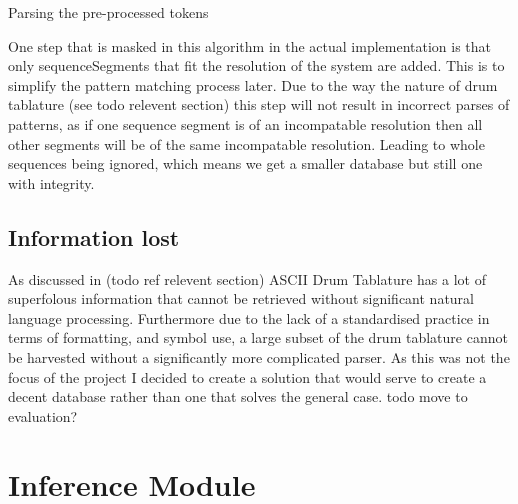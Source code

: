 \documentclass[12pt,twoside,notitlepage]{report}
\begin{document}
				\begin{algorithm}
				\caption{Parsing the pre-processed tokens}
				\label{algo:Parse}
				\begin{algorithmic}[1]
								\EndFor
							\EndFor
						\EndFor
						
					

					\EndProcedure
				\end{algorithmic}
				\end{algorithm}
				
				One step that is masked in this algorithm in the actual implementation is that only sequenceSegments that fit the resolution of the system are added. This is to simplify the pattern matching process later. Due to the way the nature of drum tablature (see todo relevent section) this step will not result in incorrect parses of patterns, as if one sequence segment is of an incompatable resolution then all other segments will be of the same incompatable resolution. Leading to whole sequences being ignored, which means we get a smaller database but still one with integrity.
		\subsection{Information lost}
					As discussed in (todo ref relevent section) ASCII Drum Tablature has a lot of superfolous information that cannot be retrieved without significant natural language processing. Furthermore due to the lack of a standardised practice in terms of formatting, and symbol use, a large subset of the drum tablature cannot be harvested without a significantly more complicated parser. As this was not the focus of the project I decided to create a solution that would serve to create a decent database rather than one that solves the general case.
		todo move to evaluation?
	\section{Inference Module}
\end{document}
